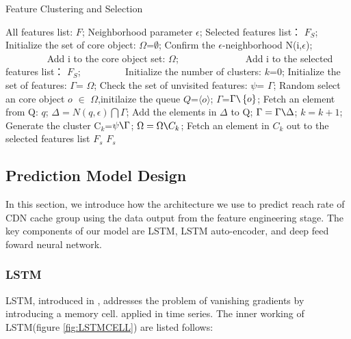 \documentclass[5p]{elsarticle}
\newcommand{\dabiaolv}{reach rate }
\begin{document}
\begin{algorithm}[t]
\caption{Feature Clustering and Selection} 
\begin{algorithmic}[1]
\Require  
    All features list: $F$;
    Neighborhood parameter $\epsilon$; 
\Ensure  
    Selected features list： $F_S$;  
\State Initialize the set of core object:  $\Omega$=$\emptyset$;
    \State Confirm the $\epsilon$-neighborhood\; N(i,$\epsilon$);
　　　　        \State Add i to the core object set: $\Omega$;
　　        \Else
　　　　        \State Add i to the selected features list： $F_S$;
　　　　    \EndIf
\EndFor
\State Initialize the number of clusters:  $k$=0;
\State Initialize the set of features:  $\Gamma$= $\Omega$;
\While{$\Omega\neq\emptyset$}
\State Check the set of unvisited features: $\psi$= $\Gamma$;
    \State Random select an core object $o$ $\in$ $\Omega$,initilaize the queue $Q$=$\langle o \rangle$;
\State $\Gamma$=$\Gamma \verb|\|\left\{o\right\}$;
    \State Fetch an element from Q: $q$;
    \State $\Delta=N(q,\epsilon)\bigcap\Gamma$;
    \State Add the elements in $\Delta$ to Q;
    \State  $\Gamma= \Gamma\verb|\|\Delta$;
\EndWhile
\State $k=k+1$;
\State Generate the cluster C$_k$=$\psi\verb|\|\Gamma$;
\State $\Omega=\Omega\verb|\|C_k$;
\EndWhile
{}
    \State Fetch an element in $C_k$ out to the selected features list $F_s$
\EndFor
\State \Return $F_s$
\end{algorithmic}
\end{algorithm}


\subsection{Prediction Model Design}

In this section, we introduce how the architecture we use to predict \dabiaolv of CDN cache group using the data output from the feature engineering stage. The key components of our model are LSTM, LSTM auto-encoder, and deep feed foward neural network.

\subsubsection{LSTM}
LSTM, introduced in \cite{Hochreiter1997LongMemory}, addresses the problem of vanishing gradients by introducing a memory cell. \cite{MalhotraLongSeries} applied in time series. The inner working of LSTM(figure \ref{fig:LSTMCELL}) are listed follows:
\end{document}
